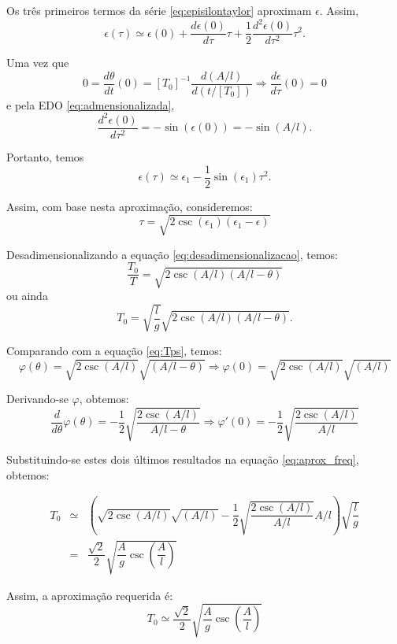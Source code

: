 {Os três primeiros termos da série \eqref{eq:episilontaylor} aproximam \(\epsilon\). Assim,
\[
\epsilon(\tau) \simeq \epsilon(0) + \dfrac{d\epsilon(0)}{d\tau} \tau + \dfrac{1}{2} \dfrac{d^2\epsilon(0)}{d\tau^2} \tau^2.
\]

Uma vez que 
\[0 = \dfrac{d\theta}{dt}(0) = [T_0]^{-1} \dfrac{d(A/l)}{d(t/[T_0])} \Rightarrow \dfrac{d\epsilon}{d\tau}(0) = 0\]
e pela EDO \eqref{eq:admensionalizada},
\[\dfrac{d^2\epsilon(0)}{d\tau^2} = -\sin(\epsilon(0)) = - \sin(A/l).\]

Portanto, temos
\[
\epsilon(\tau) \simeq \epsilon_1 - \dfrac{1}{2} \sin(\epsilon_1)\tau^2.
\]

Assim, com base nesta aproximação, consideremos:
\begin{equation}\label{eq:desadimensionalizacao}
\tau = \sqrt{2 \csc(\epsilon_1)(\epsilon_1 - \epsilon)}
\end{equation}


Desadimensionalizando a equação \eqref{eq:desadimensionalizacao}, temos:
\begin{equation}\label{eq:desarrumada1}
\dfrac{T_0}{T} = \sqrt{2 \csc(A/l)(A/l-\theta)}
\end{equation}
ou ainda
\begin{equation}\label{eq:desarrumada2}
T_0 = \sqrt{\dfrac{l}{g}} \sqrt{2 \csc(A/l) (A/l-\theta)}.
\end{equation}

Comparando com a equação \eqref{eq:Tps}, temos:
\[
\varphi(\theta) = \sqrt{2 \csc(A/l)} \sqrt{(A/l-\theta)}
\Rightarrow \varphi(0) = \sqrt{2 \csc(A/l)} \sqrt{(A/l)}
\]

Derivando-se \(\varphi\), obtemos:
\[
\dfrac{d}{d\theta}\varphi(\theta) = -\dfrac{1}{2}\sqrt{\dfrac{2 \csc(A/l)}{A/l-\theta}}
\Rightarrow
\varphi'(0) = 
-\dfrac{1}{2}\sqrt{\dfrac{2 \csc(A/l)}{A/l}}
\]

Substituindo-se estes dois últimos resultados na equação \eqref{eq:aprox_freq}, obtemos:

\[
\begin{array}{rcl}
T_{0} &\simeq&
\left(\sqrt{2 \csc(A/l)} \sqrt{(A/l)} -\dfrac{1}{2}\sqrt{\dfrac{2 \csc(A/l)}{A/l}} A/l\right) \sqrt{\dfrac{l}{g}} \\
&=& \dfrac{\sqrt{2}}{2} \sqrt{\dfrac{A}{g} \csc\left(\dfrac{A}{l}\right)}
\end{array}
\]

Assim, a aproximação requerida é:
\[
T_{0} \simeq
\dfrac{\sqrt{2}}{2} \sqrt{\dfrac{A}{g} \csc\left(\dfrac{A}{l}\right)}
\]
}



